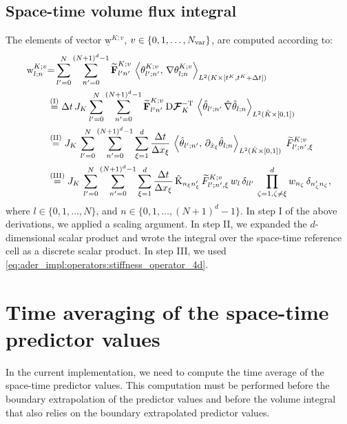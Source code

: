 \documentclass{scrreprt}
\theoremstyle{definition}
\theoremstyle{nonumberplain}
\renewcommand{\vec}[1]{{\textbf{#1}}}
\newcommand{\stvec}[1]{\widetilde{\vec{#1}}}
\newcommand{\laVec}[1]{\underline{\mathrm{#1}}}
\newcommand{\laVecel}[1]{\mathrm{#1}}
\newcommand{\laMatel}[1]{\mathrm{#1}}
\newcommand{\cell}{K}
\newcommand{\dt}{\textup{d}t}
\newcommand{\dV}{\text{d}\vec{x}}
\newcommand{\refVec}[1]{\hat{\vec{#1}}}
\newcommand{\refCell}{\hat{\cell}}
\newcommand{\jacobian}{\textup{D}\boldsymbol{\mathcal{F}}_{\cell}}
\newcommand{\detJ}{J_\cell}
\newcommand{\refdV}{\textup{d}\hat{\vec{x}}}
\newcommand{\refdt}{\textup{d}\hat{t}}
\begin{document}
\subsection{Space-time volume flux integral}
\label{sec:ader_impl:predictor:space_time_volume_flux_integral}
The elements of vector $\laVec{w}^{\cell;v}$,
$v\in\{0,1,\ldots,N_\textup{var}\}$, are computed according to:
\begin{align}
\laVecel{w}^{\cell;v}_{l;n}
&{=}
\sum_{l'=0}^{N}
\sum_{n'=0}^{(N+1)^d-1}
\stvec{F}^{K;v}_{l'n'}\,
\left\langle
\theta^{K;v}_{l';n'},\,
\nabla
\theta^{K;v}_{l;n}
\right\rangle
_{L^2(\cell\times[t^\cell,t^\cell+\Delta t])}
\notag
\\
&\overset{(\textup{I})}
{=}
\Delta t\,
\detJ
\sum_{l'=0}^{N}
\sum_{n'=0}^{(N+1)^d-1}
\stvec{F}^{K;v}_{l'n'}\,
\jacobian^{-\textup{T}}\,
\left\langle
\hat{\theta}_{l';n'}\,
\hat{\nabla}
\hat{\theta}_{l;n}
\right\rangle
_{L^2(\refCell\times[0,1])}
\notag
\\
&\overset{(\textup{II})}
{=}
\detJ\,
\sum_{l'=0}^{N}
\sum_{n'=0}^{(N+1)^d-1}
\sum_{\xi=1}^d
\frac{\Delta t}{\Delta x_{\xi}}\,
\left\langle
\hat{\theta}_{l';n'},\,
\partial_{\hat{x}_\xi}\hat{\theta}_{l;n}
\right\rangle
_{L^2(\refCell\times[0,1])}
\;\widetilde{F}^{\cell;v}_{l';n',\xi}
\notag
\\
&\overset{(\textup{III})}
{=}
\detJ\,
\sum_{l'=0}^{N}
\sum_{n'=0}^{(N+1)^d-1}
\sum_{\xi =1}^d
\frac{\Delta t}{\Delta x_{\xi}}\,
\laMatel{\hat{K}}_{n_\xi n'_\xi}\,
\widetilde{F}^{\cell;v}_{l';n',\xi}\,
w_{l}\,
\delta_{ll'}\,
\prod_{\zeta=1,\zeta\neq\xi}^d
w_{n_\zeta}\,
\delta_{n'_\zeta n_\zeta},
\end{align}
where $l\in\{0,1,\ldots,N\}$, and
$n\in\{0,1,\ldots,(N+1)^{d}-1\}$.
In step I of the above derivations, we applied a scaling argument.
In step II, we expanded the $d$-dimensional scalar
product and wrote the integral over the space-time reference cell as a
discrete scalar product.
In step III, we used \eqref{eq:ader_impl:operators:stiffness_operator_4d}.

\section{Time averaging of the space-time predictor values}
In the current implementation, we need to compute the time average of the
space-time predictor values.
This computation must be performed before the boundary extrapolation of
the predictor values and before the volume integral that also
relies on the boundary extrapolated predictor values.
\end{document}
